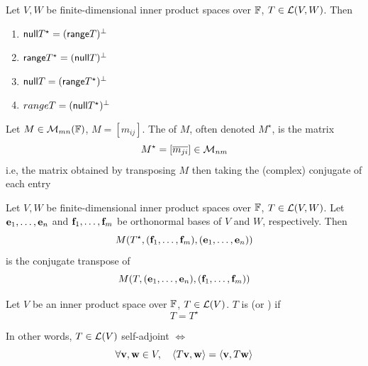 \documentclass[aspectratio=169]{beamer}
\begin{document}
\begin{frame}
\begin{importanttheorem}
Let $V,W$ be finite-dimensional inner product spaces over $\IF$, $T\in\L(V,W)$. Then
\begin{enumerate}
\item $\nullspace T^\star =(\range T)^\perp$
\item $\range T^\star =(\nullspace T)^\perp$
\item $\nullspace T=(\range T^\star )^\perp$
\item $range T=(\nullspace T^\star )^\perp$
\end{enumerate}
\end{importanttheorem}

\begin{definition}
Let $M\in\M_{mn}(\IF)$, $M=[m_{ij}]$. The  of $M$, often denoted $M^\star $, is the matrix
\[
M^\star =[\overline{m_{ji}}]\in\M_{nm}
\]
i.e, the matrix obtained by transposing $M$ then taking the (complex) conjugate of each entry
\end{definition}
\end{frame}

\begin{frame}
\begin{importanttheorem}
Let $V,W$ be finite-dimensional inner product spaces over $\IF$, $T\in\L(V,W)$. Let $\be_1,\ldots,\be_n$ and $\bf_1,\ldots,\bf_m$  be orthonormal bases of $V$ and $W$, respectively. Then
\[
M(T^\star ,(\bf_1,\ldots,\bf_m),(\be_1,\ldots,\be_n))
\]
is the conjugate transpose of 
\[
M(T,(\be_1,\ldots,\be_n),(\bf_1,\ldots,\bf_m))
\]
\end{importanttheorem}
\end{frame}


\begin{frame}
\begin{definition}
Let $V$ be an inner product space over $\IF$, $T\in\L(V)$. $T$ is  (or ) if 
\[
T=T^\star 
\]
\end{definition}

In other words, $T\in\L(V)$ self-adjoint $\iff$
\[
\forall \bv,\bw\in V,\quad \langle T\bv,\bw\rangle 
=\langle \bv,T\bw\rangle
\]
\end{frame}
\end{document}
